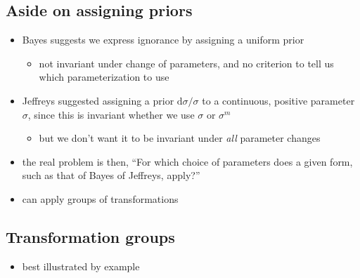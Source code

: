 \documentclass[../jaynes_prob_theory_notes.tex]{subfiles}
\begin{document}
        \subsection{Aside on assigning priors}
            \begin{itemize} 
                \item Bayes suggests we express ignorance by assigning a uniform prior
                    \begin{itemize} 
                        \item not invariant under change of parameters, and no criterion to tell us which parameterization to use
                    \end{itemize}
                \item Jeffreys suggested assigning a prior \( \mathrm{d}\sigma / \sigma \) to a continuous, positive parameter \( \sigma \), since this is invariant whether we use \( \sigma \) or \( {\sigma}^m \)
                    \begin{itemize} 
                        \item but we don't want it to be invariant under \textit{all} parameter changes
                    \end{itemize}
                \item the real problem is then, ``For which choice of parameters does a given form, such as that of Bayes of Jeffreys, apply?''
                \item can apply groups of transformations
            \end{itemize}

        \subsection{Transformation groups}
            \begin{itemize} 
                \item best illustrated by example
            \end{itemize}
\end{document}

